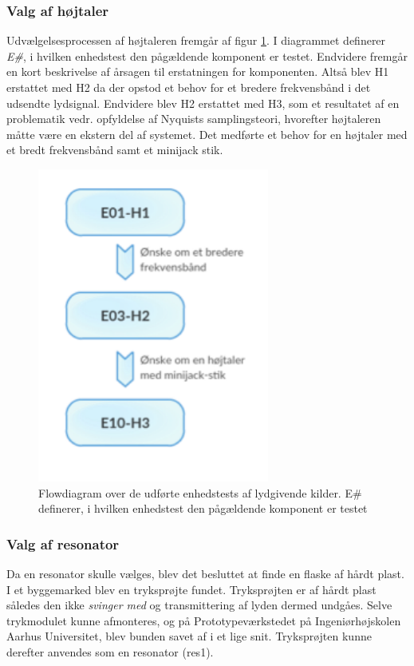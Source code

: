 \subsubsection{Valg af højtaler}
Udvælgelsesprocessen af højtaleren fremgår af figur \ref{fig:flowlyd}. I diagrammet definerer \textit{E\#}, i hvilken enhedstest den pågældende komponent er testet. Endvidere fremgår en kort beskrivelse af årsagen til erstatningen for komponenten. Altså blev H1 erstattet med H2 da der opstod et behov for et bredere frekvensbånd i det udsendte lydsignal. Endvidere blev H2 erstattet med H3, som et resultatet af en problematik vedr. opfyldelse af Nyquists samplingsteori, hvorefter højtaleren måtte være en ekstern del af systemet. Det medførte et behov for en højtaler med et bredt frekvensbånd samt et minijack stik. 

\begin{figure}[htb]
\centering
\includegraphics[width=3in]{flowdiagramelyd.png}
\caption{Flowdiagram over de udførte enhedstests af lydgivende kilder. E\# definerer, i hvilken enhedstest den pågældende komponent er testet}
\label{fig:flowlyd}
\end{figure}

\subsubsection{Valg af resonator}
Da en resonator skulle vælges, blev det besluttet at finde en flaske af hårdt plast. I et byggemarked blev en tryksprøjte fundet. Tryksprøjten er af hårdt plast således den ikke \textit{svinger med} og transmittering af lyden dermed undgåes. Selve trykmodulet kunne afmonteres, og på Prototypeværkstedet på Ingeniørhøjskolen Aarhus Universitet, blev bunden savet af i et lige snit. Tryksprøjten kunne derefter anvendes som en resonator (res1).   


